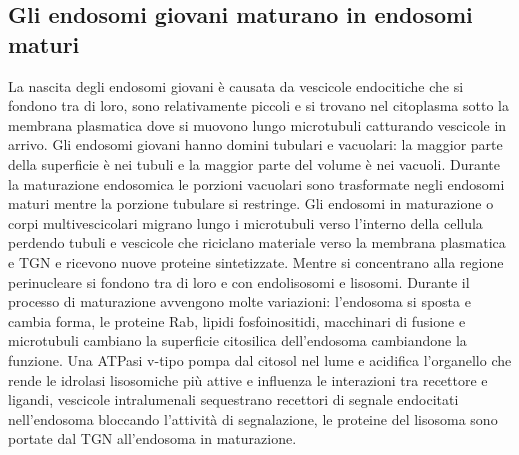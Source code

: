 \subsection{Gli endosomi giovani maturano in endosomi maturi}
La nascita degli endosomi giovani \`e causata da vescicole endocitiche che si fondono tra di loro, sono relativamente piccoli e si trovano nel citoplasma sotto la membrana plasmatica
dove si muovono lungo microtubuli catturando vescicole in arrivo. Gli endosomi giovani hanno domini tubulari e vacuolari: la maggior parte della superficie \`e nei tubuli e la maggior 
parte del volume \`e nei vacuoli. Durante la maturazione endosomica le porzioni vacuolari sono trasformate negli endosomi maturi mentre la porzione tubulare si restringe. Gli endosomi in
maturazione o corpi multivescicolari migrano lungo i microtubuli verso l'interno della cellula perdendo tubuli e vescicole che riciclano materiale verso la membrana plasmatica e TGN
e ricevono nuove proteine sintetizzate. Mentre si concentrano alla regione perinucleare si fondono tra di loro e con endolisosomi e lisosomi. Durante il processo di maturazione avvengono
molte variazioni: l'endosoma si sposta e cambia forma, le proteine Rab, lipidi fosfoinositidi, macchinari di fusione e microtubuli cambiano la superficie citosilica dell'endosoma 
cambiandone la funzione. Una ATPasi v-tipo pompa  dal citosol nel lume e acidifica l'organello che rende le idrolasi lisosomiche pi\`u attive e influenza le interazioni 
tra recettore e ligandi, vescicole intralumenali sequestrano recettori di segnale endocitati nell'endosoma bloccando l'attivit\`a di segnalazione, le proteine del lisosoma sono
portate dal TGN all'endosoma in maturazione. 
